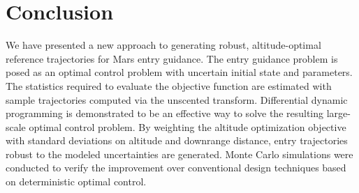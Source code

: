 \documentclass[journal ]{new-aiaa}
\begin{document}
\section*{Conclusion}

We have presented a new approach to generating robust, altitude-optimal reference trajectories for Mars entry guidance. The entry guidance problem is posed as an optimal control problem with uncertain initial state and parameters. The statistics required to evaluate the objective function are estimated with sample trajectories computed via the unscented transform. Differential dynamic programming is demonstrated to be an effective way to solve the resulting large-scale optimal control problem. By weighting the altitude optimization objective with standard deviations on altitude and downrange distance, entry trajectories robust to the modeled uncertainties are generated. Monte Carlo simulations were conducted to verify the improvement over conventional design techniques based on deterministic optimal control. 

\end{document}
